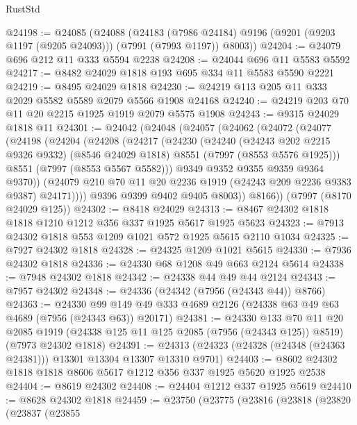 \begin{lexlean}{RustStd}
\begin{coremodule}
{\begin{coremodule}
{{{{{{{{{{{{{{{{{{{{{{{{{{{{{{{{{{{{{{{{{{{@24198 := @24085
    (@24088
      (@24183
        (@7986 @24184)
        @9196
        (@9201 (@9203 @1197 (@9205 @24093)))
        (@7991 (@7993 @1197))
        @8003))
@24204 := @24079 @696 @212 @11 @333 @5594 @2238
@24208 := @24044 @696 @11 @5583 @5592
@24217 := @8482 @24029 @1818 @193 @695 @334 @11 @5583 @5590 @2221
@24219 := @8495 @24029 @1818
@24230 := @24219 @113 @205 @11 @333 @2029 @5582 @5589 @2079 @5566 @1908 @24168
@24240 := @24219 @203 @70 @11 @20 @2215 @1925 @1919 @2079 @5575 @1908
@24243 := @9315 @24029 @1818 @11
@24301 := @24042
    (@24048
      (@24057
        (@24062
          (@24072
            (@24077
              (@24198
                (@24204
                  (@24208
                    (@24217
                      (@24230
                        (@24240
                          (@24243 @202 @2215 @9326 @9332)
                          (@8546 @24029 @1818)
                          @8551
                          (@7997 (@8553 @5576 @1925)))
                        @8551
                        (@7997 (@8553 @5567 @5582)))
                      @9349
                      @9352
                      @9355
                      @9359
                      @9364
                      @9370))
                  (@24079 @210 @70 @11 @20 @2236 @1919 (@24243 @209 @2236 @9383 @9387) @24171))))
            @9396
            @9399
            @9402
            @9405
            @8003))
        @8166))
    (@7997 (@8170 @24029 @125))
@24302 := @8418 @24029
@24313 := @8467 @24302 @1818 @1818 @1210 @1212 @356 @337 @1925 @5617 @1925 @5623
@24323 := @7913 @24302 @1818 @553 @1209 @1021 @572 @1925 @5615 @2110 @1034
@24325 := @7927 @24302 @1818
@24328 := @24325 @1209 @1021 @5615
@24330 := @7936 @24302 @1818
@24336 := @24330 @68 @1208 @49 @663 @2124 @5614
@24338 := @7948 @24302 @1818
@24342 := @24338 @44 @49 @44 @2124
@24343 := @7957 @24302
@24348 := @24336 (@24342 (@7956 (@24343 @44)) @8766)
@24363 := @24330
    @99
    @149
    @49
    @333
    @4689
    @2126
    (@24338 @63 @49 @63 @4689 (@7956 (@24343 @63)) @20171)
@24381 := @24330
    @133
    @70
    @11
    @20
    @2085
    @1919
    (@24338 @125 @11 @125 @2085 (@7956 (@24343 @125)) @8519)
    (@7973 @24302 @1818)
@24391 := @24313 (@24323 (@24328 (@24348 (@24363 @24381))) @13301 @13304 @13307 @13310 @9701)
@24403 := @8602 @24302 @1818 @1818 @8606 @5617 @1212 @356 @337 @1925 @5620 @1925 @2538
@24404 := @8619 @24302
@24408 := @24404 @1212 @337 @1925 @5619
@24410 := @8628 @24302 @1818
@24459 := @23750
    (@23775
      (@23816
        (@23818
          (@23820
            (@23837
              (@23855
}}}}}}}}}}}}}}}}}}}}}}}}}}}}}}}}}}}}}}}}}}}
\end{coremodule}}
\end{coremodule}
\end{lexlean}
